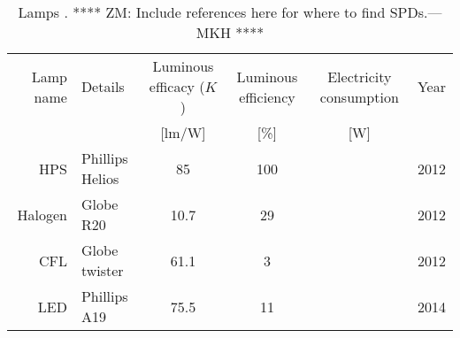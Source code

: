 

\begin{table}
\centering %
\caption{Lamps  \cite{aube2013}. **** ZM: Include references here for where to find SPDs.---MKH ****}
\begin{tabular}{r l c c c c}
  \toprule
  Lamp name 
      & Details 
      & Luminous efficacy ($K$) 
      & Luminous efficiency
      & Electricity consumption 
      & Year  \\
  
      &
      & [lm/W]
      & [\%]
      & [W] 
      & \\
  \midrule
  HPS   
      & Phillips Helios
      & 85
      & 100
      &
      & 2012 \\
  Halogen
      & Globe R20
      & 10.7
      & 29
      &
      & 2012\\
  CFL
      & Globe twister
      & 61.1
      & 3 
      &
      & 2012 \\
  LED
      & Phillips A19
      & 75.5
      & 11 
      &
      & 2014 \\
  \bottomrule
\end{tabular}
\label{tab:lamps}
\end{table}

